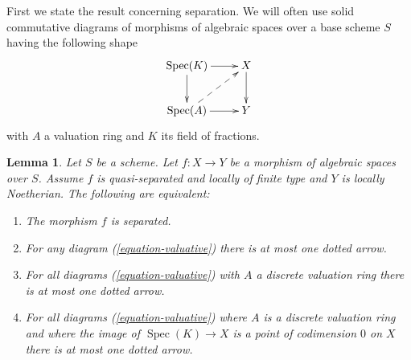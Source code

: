 \documentclass{stacks-project}
\theoremstyle{plain}
\newtheorem{lemma}[subsection]{Lemma}
\theoremstyle{definition}
\theoremstyle{remark}
\numberwithin{equation}{subsection}
\def\Spec{\mathop{\mathrm{Spec}}}
\begin{document}
\noindent
First we state the result concerning
separation. We will often use solid commutative diagrams of morphisms of
algebraic spaces over a base scheme $S$ having the following shape
\begin{equation}
\label{equation-valuative}
\vcenter{
\xymatrix{
\Spec(K) \ar[r] \ar[d] & X \ar[d] \\
\Spec(A) \ar[r] \ar@{-->}[ru] & Y
}
}
\end{equation}
with $A$ a valuation ring and $K$ its field of fractions.

\begin{lemma}
\label{lemma-Noetherian-dvr-valuative-separation}
Let $S$ be a scheme. Let $f : X \to Y$ be a morphism of algebraic spaces
over $S$. Assume $f$ is quasi-separated and locally of finite type and
$Y$ is locally Noetherian. The following are equivalent:
\begin{enumerate}
\item The morphism $f$ is separated.
\item For any diagram (\ref{equation-valuative}) there is at most
one dotted arrow.
\item For all diagrams (\ref{equation-valuative}) with $A$ a discrete
valuation ring there is at most one dotted arrow.
\item For all diagrams (\ref{equation-valuative}) where $A$ is a discrete
valuation ring and where the image of $\Spec(K) \to X$ is a point of
codimension $0$ on $X$ there is at most one dotted arrow.
\end{enumerate}
\end{lemma}
\end{document}
